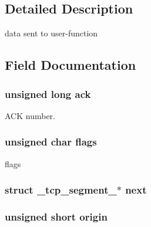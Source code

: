 \subsection{Detailed Description}
data sent to user-\/function 

\subsection{Field Documentation}
\hypertarget{struct__tcp__segment___af10658522b9bf1a01d186c69c70efc01}{
\subsubsection[{ack}]{\setlength{\rightskip}{0pt plus 5cm}unsigned long ack}}\label{struct__tcp__segment___af10658522b9bf1a01d186c69c70efc01}


A\-C\-K number. 

\hypertarget{struct__tcp__segment___a78ac89a4a0f57ffa7c2ecf31749aa390}{
\subsubsection[{flags}]{\setlength{\rightskip}{0pt plus 5cm}unsigned char flags}}\label{struct__tcp__segment___a78ac89a4a0f57ffa7c2ecf31749aa390}


flags 

\hypertarget{struct__tcp__segment___ae87e4b1042e85d16f28dbf276445d7e9}{
\subsubsection[{next}]{\setlength{\rightskip}{0pt plus 5cm}struct {\bf \-\_\-tcp\-\_\-segment\-\_\-}$\ast$ next}}\label{struct__tcp__segment___ae87e4b1042e85d16f28dbf276445d7e9}
\hypertarget{struct__tcp__segment___a2c09a48f3f12ff0e1ed8c7699f52a37d}{
\subsubsection[{origin}]{\setlength{\rightskip}{0pt plus 5cm}unsigned short origin}}\label{struct__tcp__segment___a2c09a48f3f12ff0e1ed8c7699f52a37d}


